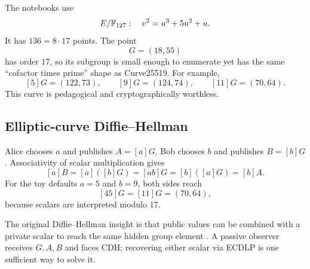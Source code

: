 The notebooks use
\[
  E/\mathbb{F}_{127}:\quad v^2=u^3+5u^2+u.
\]
It has $136=8\cdot17$ points. The point
\[
  G=(18,55)
\]
has order $17$, so its subgroup is small enough to enumerate yet has the same
``cofactor times prime'' shape as Curve25519. For example,
\[
  [5]G=(122,73),\qquad [9]G=(124,74),\qquad[11]G=(70,64).
\]
This curve is pedagogical and cryptographically worthless.

\subsection{Elliptic-curve Diffie--Hellman}

Alice chooses $a$ and publishes $A=[a]G$. Bob chooses $b$ and publishes
$B=[b]G$. Associativity of scalar multiplication gives
\[
  [a]B=[a]([b]G)=[ab]G=[b]([a]G)=[b]A.
\]
For the toy defaults $a=5$ and $b=9$, both sides reach
\[
  [45]G=[11]G=(70,64),
\]
because scalars are interpreted modulo $17$.

The original Diffie--Hellman insight is that public values can be combined
with a private scalar to reach the same hidden group element
\cite{diffie1976}. A passive observer receives $G,A,B$ and faces CDH; recovering
either scalar via ECDLP is one sufficient way to solve it.
